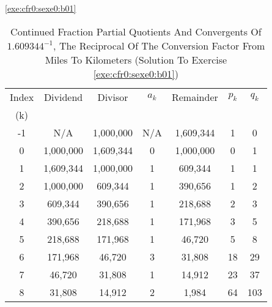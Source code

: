 \begin{vworkexercisesolution}{\ref{exe:cfr0:sexe0:b01}}
\begin{table}
\caption{Continued Fraction Partial Quotients And Convergents Of $1.609344^{-1}$, 
         The Reciprocal Of The Conversion Factor From Miles
         To Kilometers (Solution To Exercise \ref{exe:cfr0:sexe0:b01})}
\label{tbl:ccfs0:exe:cfr0:sexe0:b01:01}
\begin{center}
\begin{tabular}{|c|c|c|c|c|c|c|}
\hline
\small{Index}     &      \small{Dividend}  &       \small{Divisor} &  $a_k$ &   \small{Remainder} & $p_k$ & $q_k$ \\
\small{(k)}       &                        &                       &        &                     &       &       \\
\hline
\hline
       \small{-1} & \small{N/A}            & \small{1,000,000}     &     \small{N/A} &   \small{1,609,344}   &      \small{1} &       \small{0}  \\
\hline
       \small{0}  & \small{1,000,000}      & \small{1,609,344}     &     \small{0}   &   \small{1,000,000}   &      \small{0} &       \small{1}  \\
\hline
       \small{1}  & \small{1,609,344}      & \small{1,000,000}     &     \small{1}   &     \small{609,344}   &      \small{1} &       \small{1}  \\
\hline
       \small{2}  & \small{1,000,000}      &   \small{609,344}     &     \small{1}   &     \small{390,656}   &      \small{1} &       \small{2}  \\
\hline
       \small{3}  &   \small{609,344}      &   \small{390,656}     &     \small{1}   &     \small{218,688}   &      \small{2} &       \small{3}  \\
\hline
       \small{4}  &   \small{390,656}      &   \small{218,688}     &     \small{1}   &     \small{171,968}   &      \small{3} &       \small{5}  \\
\hline
       \small{5}  &   \small{218,688}      &   \small{171,968}     &     \small{1}   &      \small{46,720}   &      \small{5} &       \small{8}  \\
\hline
       \small{6}  &   \small{171,968}      &    \small{46,720}     &     \small{3}   &      \small{31,808}   &     \small{18} &      \small{29}  \\
\hline
       \small{7}  &    \small{46,720}      &    \small{31,808}     &     \small{1}   &      \small{14,912}   &     \small{23} &      \small{37}  \\
\hline
       \small{8}  &    \small{31,808}      &    \small{14,912}     &     \small{2}   &       \small{1,984}   &     \small{64} &     \small{103}  \\

\end{tabular}
\end{center}
\end{table}
\end{vworkexercisesolution}

